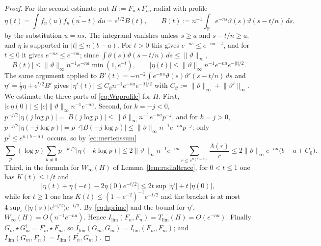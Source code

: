 \documentclass[11pt]{amsart}
\theoremstyle{definition}
\theoremstyle{remark}
\newcommand{\R}{\mathbb R}
\begin{document}
\begin{proof}
For the second estimate put $H:=F_n\star F_n^{\dagger}$, radial with profile
\[
\eta(t)=\int f_n(u)\overline{f_n(u-t)}\,du=e^{t/2}B(t),\qquad
B(t):=n^{-1}\int_{\R}e^{-ns}\vartheta(s)\vartheta(s-t/n)\,ds ,
\]
by the substitution $u=ns$.  The integrand vanishes unless $s\ge a$ and
$s-t/n\ge a$, and $\eta$ is supported in $|t|\le n(b-a)$.  For $t>0$ this gives
$e^{-ns}\le e^{-na-t}$, and for $t\le0$ it gives $e^{-ns}\le e^{-na}$; since
$\int\vartheta(s)\vartheta(s-t/n)\,ds\le\lVert\vartheta\rVert_{\infty}$,
\begin{equation}\label{eq:hprime}
|B(t)|\le\lVert\vartheta\rVert_{\infty}n^{-1}e^{-na}\min(1,e^{-t}),\qquad
|\eta(t)|\le\lVert\vartheta\rVert_{\infty}n^{-1}e^{-na}e^{-|t|/2}.
\end{equation}
The same argument applied to
$B'(t)=-n^{-2}\int e^{-ns}\vartheta(s)\vartheta'(s-t/n)\,ds$ and
$\eta'=\tfrac12\eta+e^{t/2}B'$ gives
$|\eta'(t)|\le C_{\vartheta}n^{-1}e^{-na}e^{-|t|/2}$ with
$C_{\vartheta}:=\lVert\vartheta\rVert_{\infty}+\lVert\vartheta'\rVert_{\infty}$.
We estimate the three parts of \eqref{eq:Wpprofile} for $H$.  First,
$|c\,\eta(0)|\le|c|\lVert\vartheta\rVert_{\infty}n^{-1}e^{-na}$.  Second, for
$k=-j<0$, $p^{-j/2}|\eta(j\log p)|=|B(j\log p)|\le
\lVert\vartheta\rVert_{\infty}n^{-1}e^{-na}p^{-j}$, and for $k=j>0$,
$p^{-j/2}|\eta(-j\log p)|=p^{-j}|B(-j\log p)|\le
\lVert\vartheta\rVert_{\infty}n^{-1}e^{-na}p^{-j}$; only $p^{j}\le e^{n(b-a)}$
occurs, so by \eqref{eq:mertenssum}
\[
\sum_p(\log p)\sum_{k\ne0}p^{-|k|/2}|\eta(-k\log p)|\le
2\lVert\vartheta\rVert_{\infty}n^{-1}e^{-na}
\sum_{r\le e^{n(b-a)}}\frac{\Lambda(r)}{r}
\le2\lVert\vartheta\rVert_{\infty}e^{-na}\bigl(b-a+C_0\bigr).
\]
Third, in the formula for $W_{\infty}(H)$ of Lemma~\ref{lem:radialtrace}, for
$0<t\le1$ one has $K(t)\le1/t$ and
\[
\bigl|\eta(t)+\eta(-t)-2\eta(0)e^{-t/2}\bigr|\le
2t\sup|\eta'|+t\,|\eta(0)| ,
\]
while for $t\ge1$ one has $K(t)\le(1-e^{-2})^{-1}e^{-t/2}$ and the bracket is
at most $4\sup_{s}\bigl(|\eta(s)|e^{|s|/2}\bigr)e^{-t/2}$.  By
\eqref{eq:hprime} and the bound for $\eta'$, $W_{\infty}(H)=O(n^{-1}e^{-na})$.
Hence $I_{\lim}(F_n,F_n)=T_{\lim}(H)=O(e^{-na})$.  Finally
$G_m\star G_m^{\dagger}=F_m^{\dagger}\star F_m$, so
$I_{\lim}(G_m,G_m)=I_{\lim}(F_m,F_m)$; and
$I_{\lim}(G_m,F_n)=\overline{I_{\lim}(F_n,G_m)}$.


\end{proof}
\end{document}
